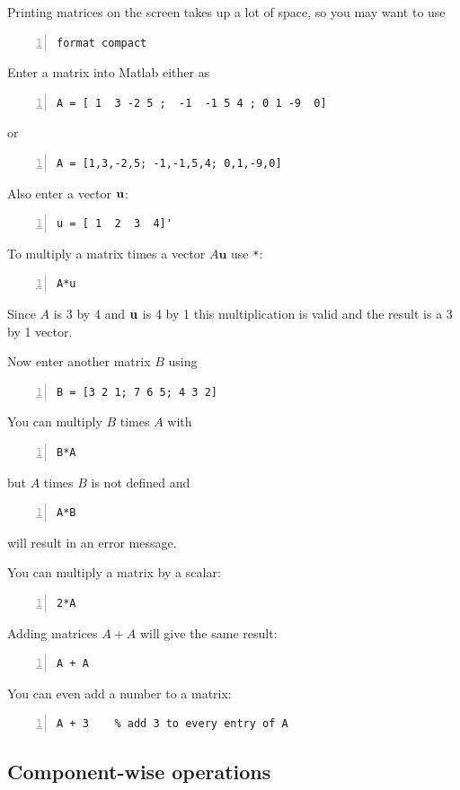 Printing matrices on the screen takes up a lot of space, so you may
want to use
\begin{lstlisting}[frame=none,numbers=left]
format compact
\end{lstlisting}
Enter a matrix into Matlab either as
\begin{lstlisting}[frame=none,numbers=left]
A = [ 1  3 -2 5 ;  -1  -1 5 4 ; 0 1 -9  0]
\end{lstlisting}
or
\begin{lstlisting}[frame=none,numbers=left]
A = [1,3,-2,5; -1,-1,5,4; 0,1,-9,0]
\end{lstlisting}
Also enter a vector $\mathbf{u}$:
\begin{lstlisting}[frame=none,numbers=left]
u = [ 1  2  3  4]'
\end{lstlisting}
To multiply a matrix times a vector $A\mathbf{u}$ use \verb&*&:
\begin{lstlisting}[frame=none,numbers=left]
A*u
\end{lstlisting}
Since $A$ is 3 by 4 and $\mathbf{u}$ is 4 by 1 this multiplication is
valid and the result is a 3 by 1 vector.

Now enter another matrix $B$ using
\begin{lstlisting}[frame=none,numbers=left]
B = [3 2 1; 7 6 5; 4 3 2]
\end{lstlisting}
You can multiply $B$ times $A$ with
\begin{lstlisting}[frame=none,numbers=left]
B*A
\end{lstlisting}
but $A$ times $B$ is not defined and
\begin{lstlisting}[frame=none,numbers=left]
A*B
\end{lstlisting}
will result in an error message.


You can multiply a matrix by a scalar:
\begin{lstlisting}[frame=none,numbers=left]
2*A
\end{lstlisting}
Adding matrices $A + A$ will give the same result:
\begin{lstlisting}[frame=none,numbers=left]
A + A
\end{lstlisting}
You can even add a number to  a matrix:
\begin{lstlisting}[frame=none,numbers=left]
A + 3    % add 3 to every entry of A
\end{lstlisting}


\subsection*{Component-wise operations}

